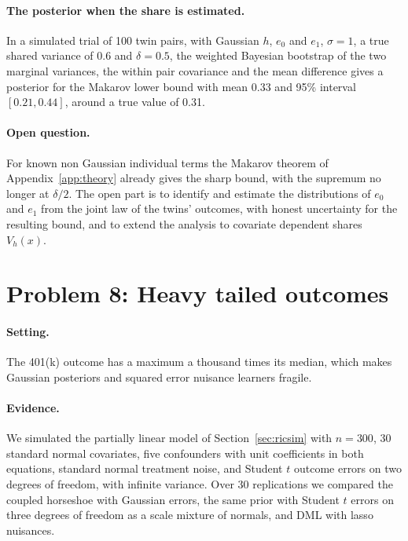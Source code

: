 \paragraph{The posterior when the share is estimated.} In a simulated trial of 100 twin pairs, with Gaussian $h$, $e_0$ and $e_1$, $\sigma = 1$, a true shared variance of 0.6 and $\delta = 0.5$, the weighted Bayesian bootstrap of the two marginal variances, the within pair covariance and the mean difference gives a posterior for the Makarov lower bound with mean 0.33 and 95\% interval $[0.21, 0.44]$, around a true value of 0.31. 

\paragraph{Open question.} For known non Gaussian individual terms the Makarov theorem of Appendix~\ref{app:theory} already gives the sharp bound, with the supremum no longer at $\delta/2$. The open part is to identify and estimate the distributions of $e_0$ and $e_1$ from the joint law of the twins' outcomes, with honest uncertainty for the resulting bound, and to extend the analysis to covariate dependent shares $V_h(x)$.

\section{Problem 8: Heavy tailed outcomes}

\paragraph{Setting.} The 401(k) outcome has a maximum a thousand times its median, which makes Gaussian posteriors and squared error nuisance learners fragile.

\paragraph{Evidence.} We simulated the partially linear model of Section~\ref{sec:ricsim} with $n = 300$, 30 standard normal covariates, five confounders with unit coefficients in both equations, standard normal treatment noise, and Student $t$ outcome errors on two degrees of freedom, with infinite variance. Over 30 replications we compared the coupled horseshoe with Gaussian errors, the same prior with Student $t$ errors on three degrees of freedom as a scale mixture of normals, and DML with lasso nuisances.


